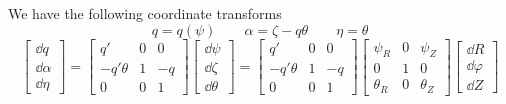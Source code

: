\documentclass[]{article}
\begin{document}
We have the following coordinate transforms
\begin{equation*}
	q = q(\psi) \qquad \alpha = \zeta - q \theta \qquad \eta = \theta
\end{equation*}
\begin{equation*}
	\begin{bmatrix}
		\dd{q} \\ \dd{\alpha} \\ \dd{\eta}
	\end{bmatrix}
	=
	\begin{bmatrix}
		q' & 0 & 0 \\
		-q' \theta & 1 & -q \\
		0 & 0 & 1
	\end{bmatrix}
	\begin{bmatrix}
		\dd{\psi} \\ \dd{\zeta} \\ \dd{\theta}
	\end{bmatrix}
	=
	\begin{bmatrix}
		q' & 0 & 0 \\
		-q' \theta & 1 & -q \\
		0 & 0 & 1
	\end{bmatrix}
	\begin{bmatrix}
		\psi_R & 0 & \psi_Z \\
		0 & 1 & 0 \\
		\theta_R & 0 & \theta_Z
	\end{bmatrix}
	\begin{bmatrix}
		\dd{R} \\ \dd{\varphi} \\ \dd{Z}
	\end{bmatrix}
\end{equation*}
\end{document}

